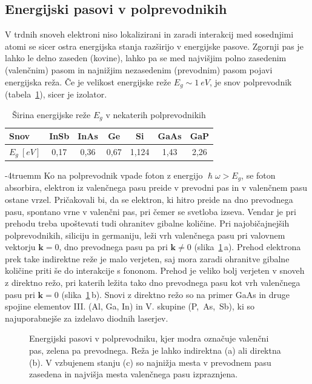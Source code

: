 \subsection*{Energijski pasovi v polprevodnikih}
V trdnih snoveh elektroni niso lokalizirani in zaradi interakcij med sosednjimi atomi
se sicer ostra energijska stanja razširijo v energijske pasove. Zgornji pas je lahko 
le delno zaseden (kovine), lahko pa se med najvišjim polno zasedenim 
(valenčnim) pasom in najnižjim nezasedenim (prevodnim) pasom pojavi energijska reža. 
Če je velikost energijske reže $E_g\sim 1~\si{eV}$, je snov polprevodnik 
(tabela~\ref{table:gap}), sicer je izolator.
\begin{table}[ht]
 \centering
\begin{tabular}{|l|c|c|c|c|c|c|} \hline  
      Snov & InSb & InAs & Ge & Si & GaAs & GaP \\ \hline
      $E_g~[\si{eV}]$ & 0,17 & 0,36 & 0,67 & 1,124 & 1,43 & 2,26  \\ \hline  
\end{tabular}
  \caption{Širina energijske reže $E_g$ v nekaterih polprevodnikih}
\label{table:gap}
\end{table}
\vglue-4truemm
Ko na polprevodnik vpade foton z energijo $\hslash\omega > E_g$, se foton absorbira, elektron
iz valenčnega pasu preide v prevodni pas in v valenčnem pasu ostane vrzel. Pričakovali bi, 
da se elektron, ki hitro preide na dno prevodnega pasu, spontano vrne v valenčni 
pas, pri čemer se svetloba izseva. Vendar je pri 
prehodu treba upoštevati tudi ohranitev gibalne količine. Pri najobičajnejših polprevodnikih, 
siliciju in germaniju, leži vrh valenčnega pasu pri valovnem vektorju $\mathbf{k}=0$, 
dno prevodnega pasu pa pri $\mathbf{k} \neq 0$ (slika~\ref{fig:Ek}\,a).
Prehod elektrona prek take indirektne reže je malo verjeten, saj mora zaradi ohranitve 
gibalne količine priti še do interakcije s fononom. Prehod je veliko bolj verjeten v 
snoveh z direktno režo, pri katerih ležita tako dno prevodnega pasu kot 
vrh valenčnega pasu 
pri $\mathbf{k}=0$ (slika~\ref{fig:Ek}\,b). Snovi z direktno režo so na primer GaAs in 
druge spojine elementov III. (Al, Ga, In) in V. skupine (P,~As,~Sb), ki so najuporabnejše za izdelavo diodnih laserjev.
\begin{figure}[ht]
\centering
\def\svgwidth{128truemm} 

\caption{Energijski pasovi v polprevodniku, kjer modra označuje valenčni pas, 
zelena pa prevodnega. Reža je lahko indirektna (a) ali direktna (b). V vzbujenem stanju (c) so 
najnižja mesta v prevodnem pasu zasedena in najvišja mesta valenčnega pasu
izpraznjena. 
}
\label{fig:Ek}
\end{figure}

